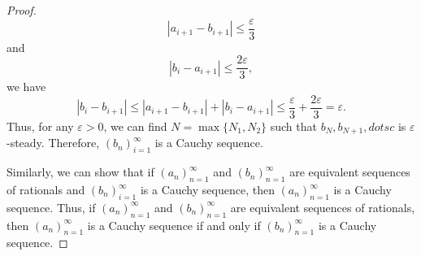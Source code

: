 \documentclass[12pt, letter]{article}
\begin{document}
\begin{proof}
\begin{equation*}
        |a_{i+1}-b_{i+1}|\leq \frac{\varepsilon}{3}
    \end{equation*}
    and 
    \begin{equation*}
        |b_i-a_{i+1}|\leq\frac{2\varepsilon}{3},
    \end{equation*}
    we have 
    \begin{equation*}
        |b_i-b_{i+1}|\leq|a_{i+1}-b_{i+1}|+|b_i-a_{i+1}|\leq\frac{\varepsilon}{3}+\frac{2\varepsilon}{3}=\varepsilon.
    \end{equation*}
    Thus, for any $\varepsilon>0$, we can find $N=\max\{N_1,N_2\}$ such that $b_N,b_{N+1},dotsc$ is $\varepsilon$-steady. Therefore, $(b_n)_{i=1}^\infty$
    is a Cauchy sequence. 

    Similarly, we can show that if $(a_n)_{n=1}^\infty$ and $(b_n)_{n=1}^\infty$ are equivalent sequences of rationals and $(b_n)_{i=1}^\infty$ is 
    a Cauchy sequence, then $(a_n)_{n=1}^\infty$ is a Cauchy sequence. Thus, if $(a_n)_{n=1}^\infty$ and $(b_n)_{n=1}^\infty$ are equivalent sequences of rationals, then $(a_n)_{n=1}^\infty$ is a Cauchy sequence if and only if $(b_n)_{n=1}^\infty$
    is a Cauchy sequence.
\end{proof}
\end{document}
